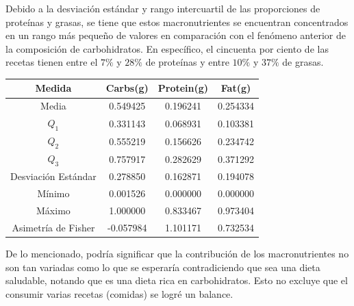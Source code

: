 \documentclass[12pt,a4paper]{article}
\begin{document}
        Debido a la desviación estándar y rango intercuartil de las proporciones 
        de proteínas y grasas, se tiene que estos macronutrientes se encuentran 
        concentrados en un rango más pequeño de valores en comparación con el 
        fenómeno anterior de la composición de carbohidratos. En específico, el 
        cincuenta por ciento de las recetas tienen entre el $7\%$ y $28\%$ de 
        proteínas y entre $10\%$ y $37\%$ de grasas.
        \begin{center}
            \begin{tabular}{|c|ccc|}
                \hline
                Medida & Carbs(g) & Protein(g) & Fat(g) \\
                \hline
                Media               & 0.549425 & 0.196241 & 0.254334  \\
                $Q_1$               & 0.331143 & 0.068931 & 0.103381  \\
                $Q_2$               & 0.555219 & 0.156626 & 0.234742  \\
                $Q_3$               & 0.757917 & 0.282629 &	0.371292  \\
                Desviación Estándar & 0.278850 & 0.162871 & 0.194078  \\
                Mínimo              & 0.001526 & 0.000000 & 0.000000  \\
                Máximo              & 1.000000 & 0.833467 & 0.973404  \\
                Asimetría de Fisher & -0.057984 & 1.101171 & 0.732534  \\
                \hline
            \end{tabular}
        \end{center}
        De lo mencionado, podría significar que la contribución de los macronutrientes 
        no son tan variadas como lo que se esperaría contradiciendo que sea una 
        dieta saludable, notando que es una dieta rica en carbohidratos. Esto no 
        excluye que el consumir varias recetas (comidas) se logré un balance.
\end{document}
